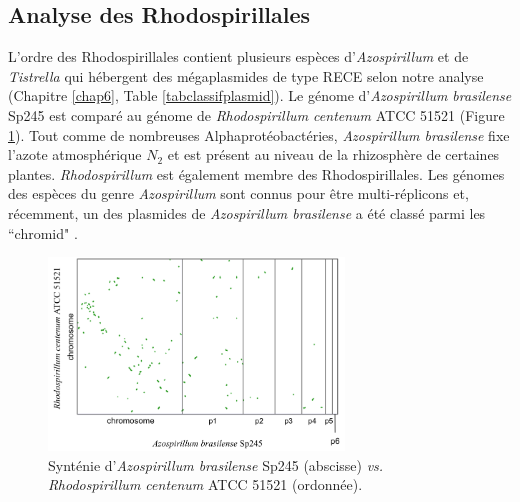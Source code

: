 \subsection{Analyse des Rhodospirillales}\label{parazos}
L'ordre des Rhodospirillales contient plusieurs espèces d'\textit{Azospirillum} et de \textit{Tistrella} qui hébergent des mégaplasmides de type RECE selon notre analyse (Chapitre \ref{chap6}, Table \ref{tabclassifplasmid}). Le génome d'\textit{Azospirillum brasilense} Sp245 est comparé au génome de \textit{Rhodospirillum centenum} ATCC 51521 (Figure \ref{figsyntazo}). Tout comme de nombreuses Alphaprotéobactéries, \textit{Azospirillum brasilense} fixe l'azote atmosphérique $N_{2}$ et est présent au niveau de la rhizosphère de certaines plantes. \textit{Rhodospirillum} est également membre des Rhodospirillales. Les génomes des espèces du genre \textit{Azospirillum} sont connus pour être multi-réplicons et, récemment, un des plasmides de \textit{Azospirillum brasilense} a été classé parmi les ``chromid" \citep{Acosta-Cruz2012}. 
 
 
\begin{figure}[H]
\begin{center}
	\includegraphics[width=0.7\textwidth]{./img/synteny/new/fig8_9.png}
	\caption[Synténie de \textit{Azospirillum} \textit{vs.} \textit{Rhodospirillum}]{Synténie d'\textit{Azospirillum brasilense} Sp245 (abscisse) \textit{vs.} \textit{Rhodospirillum centenum}  ATCC 51521 (ordonnée).}\label{figsyntazo}
\end{center}
\end{figure}   


